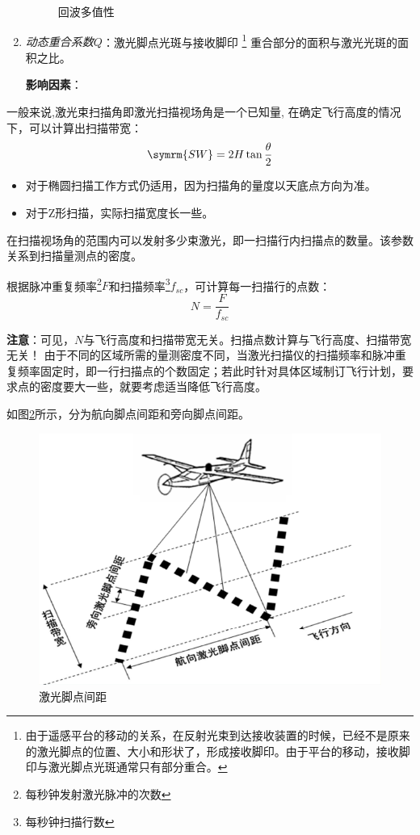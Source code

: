 \begin{enumerate}
\begin{figure}[htbp]
			\caption{回波多值性}
			\label{fig:回波多值性}
		\end{figure}
	\item \textit{动态重合系数$ Q $}：激光脚点光斑与接收脚印
		\footnote{由于遥感平台的移动的关系，在反射光束到达接收装置的时候，已经不是原来的激光脚点的位置、大小和形状了，形成接收脚印。由于平台的移动，接收脚印与激光脚点光斑通常只有部分重合。}
		重合部分的面积与激光光斑的面积之比。
		
		\textbf{影响因素}：
\end{enumerate} %

一般来说,激光束扫描角即激光扫描视场角是一个已知量, 在确定飞行高度的情况下，可以计算出扫描带宽：
\begin{equation}
\symrm{SW} = 2H \tan \dfrac{\theta}{2}
\end{equation}
\begin{itemize}
	\item 对于椭圆扫描工作方式仍适用，因为扫描角的量度以天底点方向为准。
	\item 对于Z形扫描，实际扫描宽度长一些。
\end{itemize}

在扫描视场角的范围内可以发射多少束激光，即一扫描行内扫描点的数量。该参数关系到扫描量测点的密度。

根据脉冲重复频率\footnote{每秒钟发射激光脉冲的次数}$ F $和扫描频率\footnote{每秒钟扫描行数}$ f_{sc} $，可计算每一扫描行的点数：
\begin{equation}
N = \dfrac{F}{f_{sc}}
\end{equation}

\textbf{注意}：可见，$ N $与飞行高度和扫描带宽无关。扫描点数计算与飞行高度、扫描带宽无关！
由于不同的区域所需的量测密度不同，当激光扫描仪的扫描频率和脉冲重复频率固定时，即一行扫描点的个数固定；若此时针对具体区域制订飞行计划，要求点的密度要大一些，就要考虑适当降低飞行高度。

如图\ref{fig:激光脚点间距}所示，分为航向脚点间距和旁向脚点间距。
\begin{figure}[htbp]
	\centering
	\includegraphics[width=0.5\linewidth]{figure/Chapter4/激光脚点间距}
	\caption{激光脚点间距}
	\label{fig:激光脚点间距}
\end{figure}

